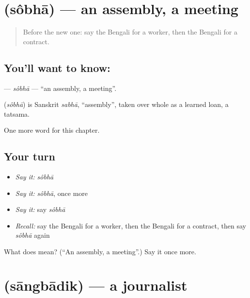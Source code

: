 \section[\texorpdfstring{\bn{সভা} (sôbhā)}{সভা (sôbhā)}]{ (sôbhā) — an assembly, a meeting}

\label{lesson:BN-C236-sobha}



\begin{quote}
Before the new one: say the Bengali for a worker, then the Bengali for a contract.
\end{quote}

\subsection*{You'll want to know: }
\textbf{} — \emph{sôbhā} — \textquotedblleft{}an assembly, a meeting\textquotedblright{}.

\begin{cousinweb}
\textbf{} (\emph{sôbhā}) is Sanskrit \emph{sabhā}, \textquotedblleft{}assembly\textquotedblright{}, taken over whole as a learned loan, a tatsama.
\end{cousinweb}

\begin{grammarlens}[title={What you've built}]
One more word for this chapter.
\end{grammarlens}

\subsection*{Your turn}
\begin{itemize}
\raggedright
  \item \emph{Say it:} \emph{sôbhā}
  \item \emph{Say it:} \emph{sôbhā}, once more
  \item \emph{Say it:} say \emph{sôbhā}
  \item \emph{Recall:} say the Bengali for a worker, then the Bengali for a contract, then say \emph{sôbhā} again
\end{itemize}

\begin{tcolorbox}[breakable,colback=teal!4,colframe=teal!35!black,title={Before you move on}]
What does  mean? (\textquotedblleft{}An assembly, a meeting\textquotedblright{}.) Say it once more.
\end{tcolorbox}
\section[\texorpdfstring{\bn{সাংবাদিক} (sāngbādik)}{সাংবাদিক (sāngbādik)}]{ (sāngbādik) — a journalist}

